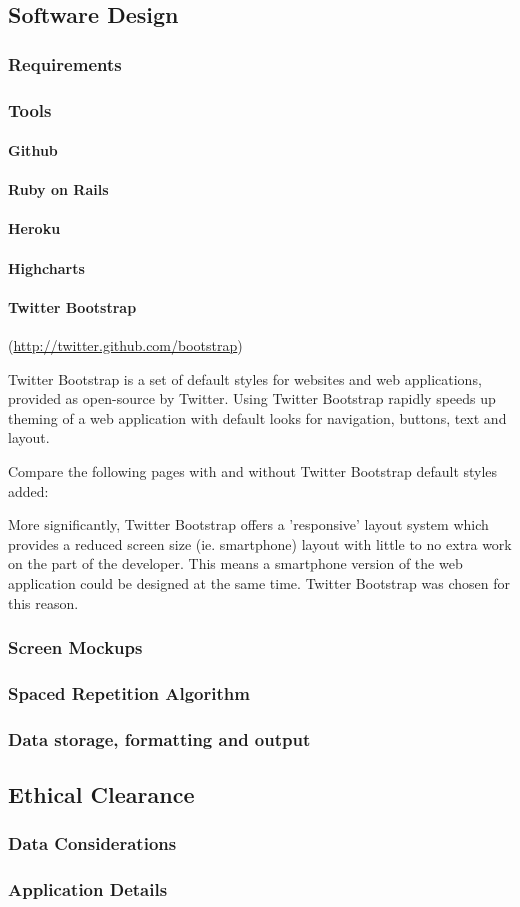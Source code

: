 \subsection{Software Design}
\subsubsection{Requirements}
\subsubsection{Tools}
\paragraph{Github}
\paragraph{Ruby on Rails}
\paragraph{Heroku}
\paragraph{Highcharts}
\paragraph{Twitter Bootstrap}
(\url{http://twitter.github.com/bootstrap})

Twitter Bootstrap is a set of default styles for websites and web applications, provided as open-source by Twitter. Using Twitter Bootstrap rapidly speeds up theming of a web application with default looks for navigation, buttons, text and layout.

Compare the following pages with and without Twitter Bootstrap default styles added:

More significantly, Twitter Bootstrap offers a 'responsive' layout system which provides a reduced screen size (ie. smartphone) layout with little to no extra work on the part of the developer. This means a smartphone version of the web application could be designed at the same time. Twitter Bootstrap was chosen for this reason.
\subsubsection{Screen Mockups}
\subsubsection{Spaced Repetition Algorithm}
\subsubsection{Data storage, formatting and output}

\subsection{Ethical Clearance}
\subsubsection{Data Considerations}
\subsubsection{Application Details}
